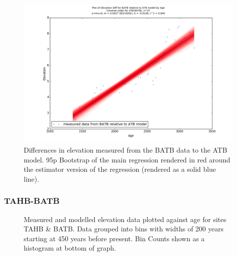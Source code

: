 \begin{figure}[H]
	\includegraphics[width=1.7\linewidth, angle=270 ]{data/bothNonZero/withinSeventyFivePercent/gias/theGIA_BATB_relative_to_ATB.png}
	\caption{Differences in elevation measured from the BATB data to the ATB model. 95p Bootstrap of the main regression rendered in red around the estimator version of the regression (rendered as a solid blue line).}
	\label{fig:gias_BATBxATB}
\end{figure}
\newpage













\subsubsection{TAHB-BATB}

\begin{figure}[H]
	\caption{Measured and modelled elevation data plotted against age for sites TAHB \& BATB. Data grouped into bins with widths of 200 years starting at 450 years before present. Bin Counts shown as a histogram at bottom of graph.}	
	\label{fig:data_TAHBxBATB}
\end{figure}

